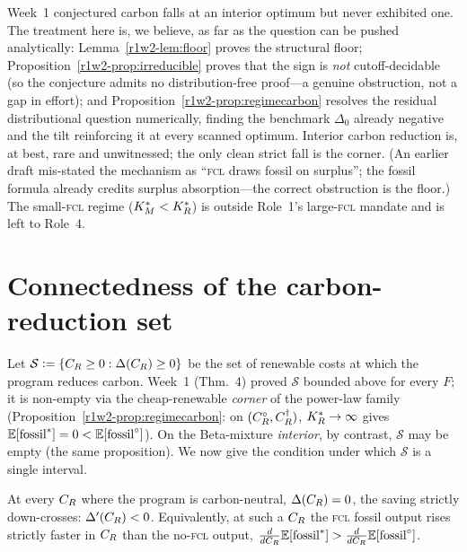 \begin{remark}
Week~1 conjectured carbon falls at an interior optimum but never exhibited one. The
treatment here is, we believe, as far as the question can be pushed analytically:
Lemma~\ref{r1w2-lem:floor} proves the structural floor;
Proposition~\ref{r1w2-prop:irreducible} proves that the sign is \emph{not} cutoff-decidable
(so the conjecture admits no distribution-free proof---a genuine obstruction, not a
gap in effort); and Proposition~\ref{r1w2-prop:regimecarbon} resolves the residual
distributional question numerically, finding the benchmark $\Delta_0$ already
negative and the tilt reinforcing it at every scanned optimum. Interior carbon
reduction is, at best, rare and unwitnessed; the only clean strict fall is the
corner. (An earlier draft mis-stated the mechanism as ``\textsc{fcl} draws fossil on
surplus''; the fossil formula already credits surplus absorption---the correct
obstruction is the floor.) The small-\textsc{fcl} regime ($K_M^{*}<K_R^{*}$) is outside
Role~1's large-\textsc{fcl} mandate and is left to Role~4.
\end{remark}

\section{Connectedness of the carbon-reduction set}\label{r1w2-sec:connected}

Let $\mathcal S\vcentcolon=\{C_R\ge0:\Delta(C_R)\ge0\}$ be the set of renewable costs at
which the program reduces carbon. Week~1 (Thm.~4) proved $\mathcal S$ bounded above
for every $F$; it is non-empty via the cheap-renewable \emph{corner} of the
power-law family (Proposition~\ref{r1w2-prop:regimecarbon}: on $(C_R^{\circ},C_R^{\dagger})$,
$K_R^{*}\to\infty$ gives $\mathbb{E}[\text{fossil}^{*}]=0<\mathbb{E}[\text{fossil}^{\circ}]$). On the
Beta-mixture \emph{interior}, by contrast, $\mathcal S$ may be empty (the same
proposition). We now give the condition under which $\mathcal S$ is a single
interval.

\begin{condition}\label{r1w2-cond:mrsv}
At every $C_R$ where the program is carbon-neutral, $\Delta(C_R)=0$, the saving
strictly down-crosses: $\Delta'(C_R)<0$. Equivalently, at such a $C_R$ the
\textsc{fcl} fossil output rises strictly faster in $C_R$ than the
no-\textsc{fcl} output,
$\frac{d}{dC_R}\mathbb{E}[\text{fossil}^{*}]>\frac{d}{dC_R}\mathbb{E}[\text{fossil}^{\circ}]$.
\end{condition}

